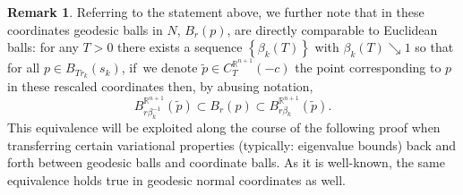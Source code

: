 \documentclass[JEP,XML,SOM,Unicode]{cedram}
\theoremstyle{definition}
\newtheorem{rmk}[thm]{Remark}
\newcommand{\R}{\mathbb{R}}
\begin{document}
\begin{rmk}\label{rmk:equivballs}
Referring to the statement above, we further note that in these coordinates geodesic balls in $N$, $B_r(p)$, are directly comparable to Euclidean balls: for any $T>0$ there exists a sequence $\left\{\beta_k(T)\right\}$ with $\beta_k(T) \searrow 1$ so that for all $p\in B_{Tr_k}(s_k)$, if~we denote $\widetilde{p}\in C^{\R^{n+1}}_{T}(-c)$ the point corresponding to $p$ in these rescaled coordinates then, by abusing notation,
$$B^{\R^{n+1}}_{r\beta_k^{-1}}(\widetilde{p}) \subset B_r(p)\subset B^{\R^{n+1}}_{r \beta_k}(\widetilde{p}).$$
This equivalence will be exploited along the course of the following proof when transferring certain variational properties (typically: eigenvalue bounds) back and forth between geodesic balls and coordinate balls. As it is well-known, the same equivalence holds true in geodesic normal coordinates as well.
\end{rmk}
\end{document}
